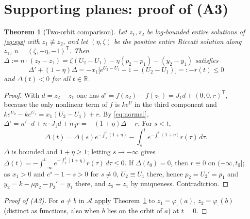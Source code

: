 \documentclass[11pt,a4paper]{article}
\numberwithin{equation}{section}
\newtheorem{theorem}{Theorem}[section]
\theoremstyle{remark}\newtheorem{remark}[theorem]{Remark}
\newcommand{\R}{\mathbb R}
\newcommand{\cA}{\mathcal A}
\begin{document}
\section{Supporting planes: proof of (A3)}\label{sec:support}
\begin{theorem}[Two-orbit comparison]\label{thm:support}
Let $z_1,z_2$ be log-bounded entire solutions of \eqref{eq:sys} with $z_1\not\equiv z_2$, and let $(\eta,\zeta)$ be
the positive entire Riccati solution along $z_1$, $n=(\zeta,-\eta,-1)^{\mathsf T}$. Then
$\Delta:=n\cdot(z_2-z_1)=\zeta(U_2-U_1)-\eta(p_2-p_1)-(y_2-y_1)$ satisfies
\begin{equation}\label{eq:deltaode}
\Delta'+(1+\eta)\Delta=-x_1\bigl[e^{U_2-U_1}-1-(U_2-U_1)\bigr]=:-r(t)\le0
\end{equation}
and $\Delta(t)<0$ for all $t\in\R$.
\end{theorem}
\begin{proof}
With $d=z_2-z_1$ one has $d'=f(z_2)-f(z_1)=J_1d+(0,0,r)^{\mathsf T}$, because the only nonlinear term of $f$ is
$ke^{U}$ in the third component and $ke^{U_2}-ke^{U_1}=x_1(U_2-U_1)+r$. By \eqref{eq:normal},
$\Delta'=n'\cdot d+n\cdot J_1d+n_3r=-(1+\eta)\Delta-r$. For $s<t$,
\[
\Delta(t)=\Delta(s)e^{-\int_s^t(1+\eta)}-\int_s^te^{-\int_\tau^t(1+\eta)}r(\tau)\,d\tau .
\]
$\Delta$ is bounded and $1+\eta\ge1$; letting $s\to-\infty$ gives
$\Delta(t)=-\int_{-\infty}^te^{-\int_\tau^t(1+\eta)}r(\tau)\,d\tau\le0$. If $\Delta(t_0)=0$, then $r\equiv0$ on
$(-\infty,t_0]$; as $x_1>0$ and $e^{s}-1-s>0$ for $s\ne0$, $U_2\equiv U_1$ there, hence $p_2=U_2'=p_1$ and
$y_2=k-\mu p_2-p_2'=y_1$ there, and $z_2\equiv z_1$ by uniqueness. Contradiction.
\end{proof}
\begin{proof}[Proof of (A3)]
For $a\ne b$ in $\cA$ apply Theorem~\ref{thm:support} to $z_1=\varphi_{\cdot}(a)$, $z_2=\varphi_{\cdot}(b)$ (distinct
as functions, also when $b$ lies on the orbit of $a$) at $t=0$.
\end{proof}
\end{document}
